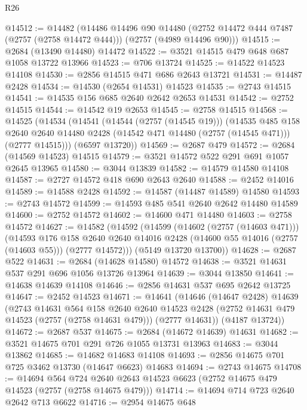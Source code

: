 \begin{lexlean}{R26}
\begin{coremodule}
@14512 := @14482
    (@14486
      @14496
      @90
      @14480
      (@2752 @14472 @444 @7487 (@2757 (@2758 @14472 @444)))
      (@2757 (@4989 @14496 @90)))
@14515 := @2684 (@13490 @14480) @14472
@14522 := @3521 @14515 @479 @648 @687 @1058 @13722 @13966
@14523 := @706 @13724
@14525 := @14522 @14523 @14108
@14530 := @2856 @14515 @471 @686 @2643 @13721
@14531 := @14487 @2428
@14534 := @14530 (@2654 @14531) @14523
@14535 := @2743 @14515
@14541 := @14535 @156 @685 @2640 @2642 @2653 @14531
@14542 := @2752 @14515
@14544 := @14542 @19 @2653
@14545 := @2758 @14515
@14568 := @14525
    (@14534
      (@14541
        (@14544 (@2757 (@14545 @19)))
        (@14535
          @485
          @158
          @2640
          @2640
          @14480
          @2428
          (@14542 @471 @14480 (@2757 (@14545 @471)))
          (@2777 @14515)))
      (@6597 @13720))
@14569 := @2687 @479
@14572 := @2684 (@14569 @14523) @14515
@14579 := @3521 @14572 @522 @291 @691 @1057 @2645 @13965
@14580 := @3044 @13839
@14582 := @14579 @14580 @14108
@14587 := @2727 @14572 @418 @690 @2643 @2640
@14588 := @2452 @14016
@14589 := @14588 @2428
@14592 := @14587 (@14487 @14589) @14580
@14593 := @2743 @14572
@14599 := @14593 @485 @541 @2640 @2642 @14480 @14589
@14600 := @2752 @14572
@14602 := @14600 @471 @14480
@14603 := @2758 @14572
@14627 := @14582
    (@14592
      (@14599
        (@14602 (@2757 (@14603 @471)))
        (@14593
          @176
          @158
          @2640
          @2640
          @14016
          @2428
          (@14600 @55 @14016 (@2757 (@14603 @55)))
          (@2777 @14572)))
      (@5149 @13720 @13700))
@14628 := @2687 @522
@14631 := @2684 (@14628 @14580) @14572
@14638 := @3521 @14631 @537 @291 @696 @1056 @13726 @13964
@14639 := @3044 @13850
@14641 := @14638 @14639 @14108
@14646 := @2856 @14631 @537 @695 @2642 @13725
@14647 := @2452 @14523
@14671 := @14641
    (@14646
      (@14647 @2428)
      @14639
      (@2743
        @14631
        @564
        @158
        @2640
        @2640
        @14523
        @2428
        (@2752 @14631 @479 @14523 (@2757 (@2758 @14631 @479)))
        (@2777 @14631))
      (@4187 @13724))
@14672 := @2687 @537
@14675 := @2684 (@14672 @14639) @14631
@14682 := @3521 @14675 @701 @291 @726 @1055 @13731 @13963
@14683 := @3044 @13862
@14685 := @14682 @14683 @14108
@14693 := @2856 @14675 @701 @725 @3462 @13730 (@14647 @6623) @14683
@14694 := @2743 @14675
@14708 := @14694
    @564
    @724
    @2640
    @2643
    @14523
    @6623
    (@2752 @14675 @479 @14523 (@2757 (@2758 @14675 @479)))
@14714 := @14694 @714 @723 @2640 @2642 @713 @6622
@14716 := @2954 @14675 @648

\end{coremodule}
\end{lexlean}
